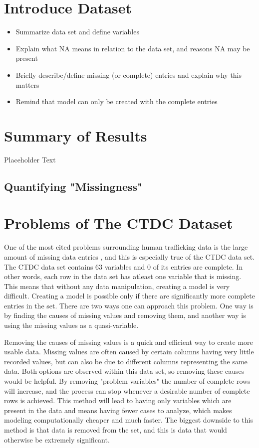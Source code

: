 \documentclass{article} %
\begin{document}
	
	
	\section{Introduce Dataset}
	\begin{itemize}
	\item Summarize data set and define variables %
	\item Explain what NA means in relation to the data set, and reasons NA may be present
	\item Briefly describe/define missing (or complete) entries and explain why this matters
	\item Remind that model can only be created with the complete entries
	\end{itemize}

	\newpage
	\section{Summary of Results}
	Placeholder Text
	\subsection{Quantifying "Missingness"}
	
	
	
	\newpage
	\section{Problems of The CTDC Dataset}
	
	One of the most cited problems surrounding human trafficking data is the large amount of missing data entries \parencite{SlaveBook, polarisTypology}, and this is especially true of the CTDC data set. The CTDC data set contains 63 variables and 0 of its entries are complete. In other words, each row in the data set has atleast one variable that is missing. This means that without any data manipulation, creating a model is very difficult. Creating a model is possible only if there are significantly more complete entries in the set. There are two ways one can approach this problem. One way is by finding the causes of missing values and removing them, and another way is using the missing values as a quasi-variable. 
	
	Removing the causes of missing values is a quick and efficient way to create more usable data. Missing values are often caused by certain columns having very little recorded values, but can also be due to different columns representing the same data. Both options are observed within this data set, so removing these causes would be helpful. By removing "problem variables" the number of complete rows will increase, and the process can stop whenever a desirable number of complete rows is achieved. This method will lead to having only variables which are present in the data and means having fewer cases to analyze, which makes modeling computationally cheaper and much faster. The biggest downside to this method is that data is removed from the set, and this is data that would otherwise be extremely significant.
	
\end{document}
